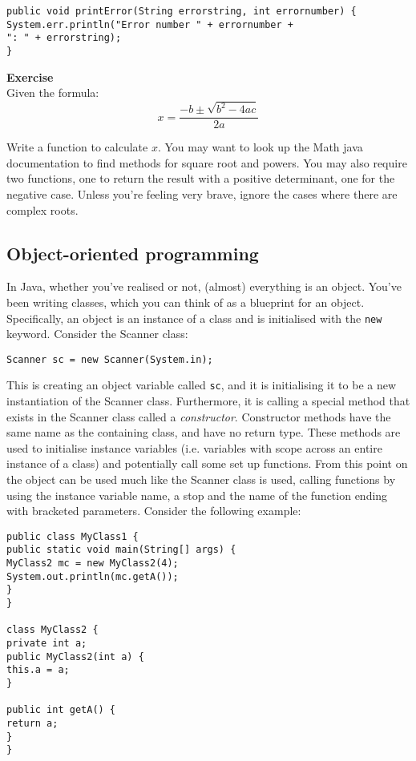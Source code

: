 \begin{verbatim}
public void printError(String errorstring, int errornumber) {
System.err.println("Error number " + errornumber +
": " + errorstring);
}
\end{verbatim}

\noindent
{\bf Exercise}\\

\noindent
Given the formula:
$$x = \displaystyle\frac{-b \pm \sqrt{b^2 - 4ac}}{2a}$$

\noindent
Write a function to calculate $x$. You may want to look up the Math java documentation to find methods for square root and powers. You may also require two functions, one to return the result with a positive determinant, one for the negative case. Unless you're feeling very brave, ignore the cases where there are complex roots.

\subsection{Object-oriented programming}

In Java, whether you've realised or not, (almost) everything is an object. You've been writing classes, which you can think of as a blueprint for an object. Specifically, an object is an instance of a class and is initialised with the {\tt new} keyword. Consider the Scanner class:

\begin{verbatim}
Scanner sc = new Scanner(System.in);
\end{verbatim}

\noindent
This is creating an object variable called {\tt sc}, and it is initialising it to be a new instantiation of the Scanner class. Furthermore, it is calling a special method that exists in the Scanner class called a \emph{constructor}. Constructor methods have the same name as the containing class, and have no return type. These methods are used to initialise instance variables (i.e. variables with scope across an entire instance of a class) and potentially call some set up functions. From this point on the object can be used much like the Scanner class is used, calling functions by using the instance variable name, a stop and the name of the function ending with bracketed parameters. Consider the following example:

\begin{verbatim}
public class MyClass1 {
public static void main(String[] args) {
MyClass2 mc = new MyClass2(4);
System.out.println(mc.getA());
}
}

class MyClass2 {
private int a;
public MyClass2(int a) {
this.a = a;
}

public int getA() {
return a;
}
}
\end{verbatim}

